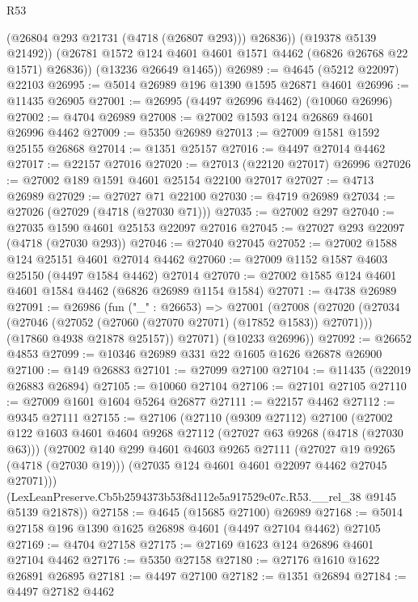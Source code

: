 \begin{lexlean}{R53}
\begin{coremodule}
              (@26804 @293 @21731 (@4718 (@26807 @293)))
              @26836))
          (@19378 @5139 @21492))
        (@26781 @1572 @124 @4601 @4601 @1571 @4462 (@6826 @26768 @22 @1571) @26836))
      (@13236 @26649 @1465))
@26989 := @4645 (@5212 @22097) @22103
@26995 := @5014 @26989 @196 @1390 @1595 @26871 @4601
@26996 := @11435 @26905
@27001 := @26995 (@4497 @26996 @4462) (@10060 @26996)
@27002 := @4704 @26989
@27008 := @27002 @1593 @124 @26869 @4601 @26996 @4462
@27009 := @5350 @26989
@27013 := @27009 @1581 @1592 @25155 @26868
@27014 := @1351 @25157
@27016 := @4497 @27014 @4462
@27017 := @22157 @27016
@27020 := @27013 (@22120 @27017) @26996
@27026 := @27002 @189 @1591 @4601 @25154 @22100 @27017
@27027 := @4713 @26989
@27029 := @27027 @71 @22100
@27030 := @4719 @26989
@27034 := @27026 (@27029 (@4718 (@27030 @71)))
@27035 := @27002 @297
@27040 := @27035 @1590 @4601 @25153 @22097 @27016
@27045 := @27027 @293 @22097 (@4718 (@27030 @293))
@27046 := @27040 @27045
@27052 := @27002 @1588 @124 @25151 @4601 @27014 @4462
@27060 := @27009 @1152 @1587 @4603 @25150 (@4497 @1584 @4462) @27014
@27070 := @27002 @1585 @124 @4601 @4601 @1584 @4462 (@6826 @26989 @1154 @1584)
@27071 := @4738 @26989
@27091 := @26986
    (fun ("_" : @26653) =>
    @27001
      (@27008
        (@27020
          (@27034 (@27046 (@27052 (@27060 (@27070 @27071) (@17852 @1583)) @27071)))
          (@17860 @4938 @21878 @25157))
        @27071)
      (@10233 @26996))
@27092 := @26652 @4853
@27099 := @10346 @26989 @331 @22 @1605 @1626 @26878 @26900
@27100 := @149 @26883
@27101 := @27099 @27100
@27104 := @11435 (@22019 @26883 @26894)
@27105 := @10060 @27104
@27106 := @27101 @27105
@27110 := @27009 @1601 @1604 @5264 @26877
@27111 := @22157 @4462
@27112 := @9345 @27111
@27155 := @27106
    (@27110
      (@9309 @27112)
      @27100
      (@27002
        @122
        @1603
        @4601
        @4604
        @9268
        @27112
        (@27027 @63 @9268 (@4718 (@27030 @63)))
        (@27002
          @140
          @299
          @4601
          @4603
          @9265
          @27111
          (@27027 @19 @9265 (@4718 (@27030 @19)))
          (@27035 @124 @4601 @4601 @22097 @4462 @27045 @27071)))
      (LexLeanPreserve.Cb5b2594373b53f8d112e5a917529c07c.R53.__rel_38 @9145 @5139 @21878))
@27158 := @4645 (@15685 @27100) @26989
@27168 := @5014 @27158 @196 @1390 @1625 @26898 @4601 (@4497 @27104 @4462) @27105
@27169 := @4704 @27158
@27175 := @27169 @1623 @124 @26896 @4601 @27104 @4462
@27176 := @5350 @27158
@27180 := @27176 @1610 @1622 @26891 @26895
@27181 := @4497 @27100
@27182 := @1351 @26894
@27184 := @4497 @27182 @4462

\end{coremodule}
\end{lexlean}
